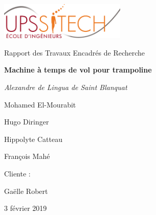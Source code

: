 \documentclass[french]{article}
\begin{document}
\begin{titlepage}
	\centering
    
    \includegraphics[width=6cm]{photoAlex/logo_upssitech.png}
    \par
    
    \vspace{1cm}
    
	{\Large Rapport des Travaux Encadrés de Recherche\par}
	\vspace{1.5cm}
	{\huge\bfseries Machine à temps de vol pour trampoline\par}
	\vspace{2cm}
	{\Large\itshape
    Alexandre de Lingua de Saint Blanquat

	Mohamed El-Mourabit

	Hugo Diringer

	Hippolyte Catteau

	François Mahé
    \par}
    
	\vfill
    Cliente :\par
    Gaëlle Robert

	\vfill
	{\large 3 février 2019\par}
\end{titlepage}
\end{document}
